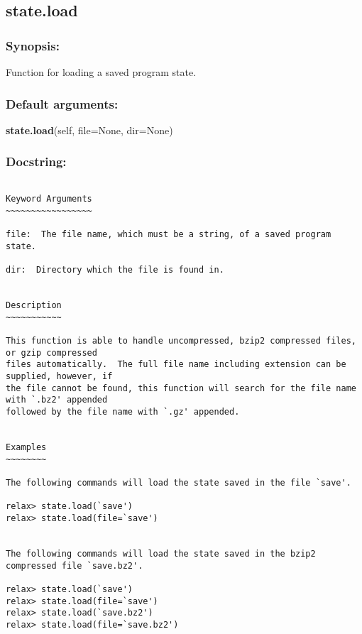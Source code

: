 \newpage

\subsection{state.load}


\subsubsection{Synopsis:}

Function for loading a saved program state.

\subsubsection{Default arguments:}

\textsf{\textbf{state.load}(self, file=None, dir=None)
}


\subsubsection{Docstring:}

{\scriptsize
\begin{verbatim}

Keyword Arguments
~~~~~~~~~~~~~~~~~

file:  The file name, which must be a string, of a saved program state.

dir:  Directory which the file is found in.


Description
~~~~~~~~~~~

This function is able to handle uncompressed, bzip2 compressed files, or gzip compressed
files automatically.  The full file name including extension can be supplied, however, if
the file cannot be found, this function will search for the file name with `.bz2' appended
followed by the file name with `.gz' appended.


Examples
~~~~~~~~

The following commands will load the state saved in the file `save'.

relax> state.load(`save')
relax> state.load(file=`save')


The following commands will load the state saved in the bzip2 compressed file `save.bz2'.

relax> state.load(`save')
relax> state.load(file=`save')
relax> state.load(`save.bz2')
relax> state.load(file=`save.bz2')
\end{verbatim}
}



